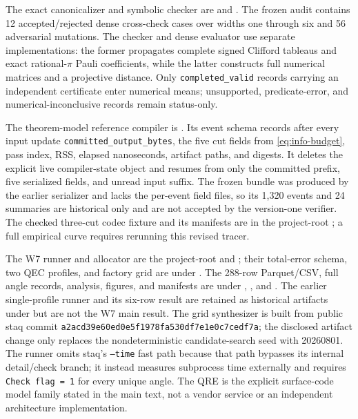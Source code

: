 The exact canonicalizer and symbolic checker are
 and
.  The frozen audit
 contains 12 accepted/rejected dense
cross-check cases over widths one through six and 56 adversarial mutations.
The checker and dense evaluator use separate implementations: the former
propagates complete signed Clifford tableaus and exact rational-$\pi$ Pauli
coefficients, while the latter constructs full numerical matrices and a
projective distance.  Only \texttt{completed\_valid} records carrying an
independent certificate enter numerical means; unsupported, predicate-error,
and numerical-inconclusive records remain status-only.

The theorem-model reference compiler is
.  Its event schema records after every input update
\texttt{committed\_output\_bytes}, the five cut fields from
\eqref{eq:info-budget}, pass index, RSS, elapsed nanoseconds, artifact paths,
and digests.  It deletes the explicit live compiler-state object and resumes
from only the committed prefix, five serialized fields, and unread input
suffix.  The frozen  bundle was produced by the
earlier serializer and lacks the per-event field files, so its 1,320 events and
24 summaries are historical only and are not accepted by the version-one
verifier.  The checked three-cut codec fixture and its manifests are in the
project-root ; a full empirical curve
requires rerunning this revised tracer.

The W7 runner and allocator are the project-root
 and
; their total-error schema, two QEC
profiles, and factory grid are under .  The 288-row Parquet/CSV,
full angle records, analysis, figures, and manifests are under
, , and
.  The earlier single-profile runner and its six-row result are
retained as historical artifacts under  but
are not the W7 main result.  The grid synthesizer is built from
public staq commit
\texttt{a2acd39e60ed0e5f1978fa530df7e1e0c7cedf7a}; the disclosed artifact change
only replaces the nondeterministic candidate-search seed with 20260801.  The
runner omits staq's \texttt{--time} fast path because that path bypasses its
internal detail/check branch; it instead measures subprocess time externally
and requires \texttt{Check flag = 1} for every unique angle.  The QRE is the
explicit surface-code model family stated in the main text, not a vendor
service or an independent architecture implementation.

